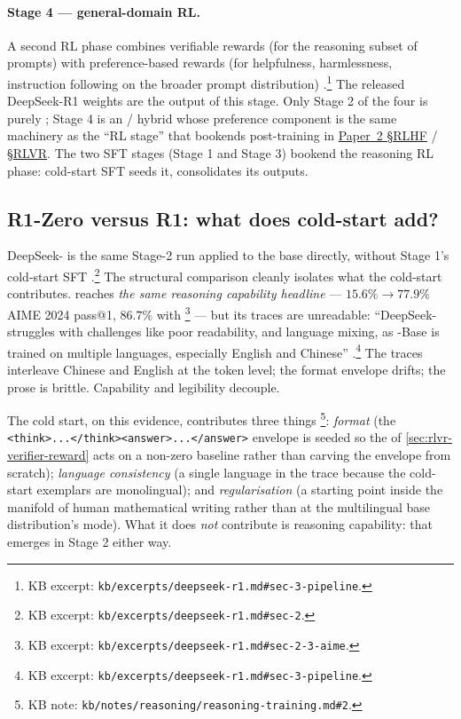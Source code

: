 \paragraph{Stage 4 --- general-domain RL.} A second RL phase combines
verifiable rewards (for the reasoning subset of prompts) with
preference-based rewards (for helpfulness, harmlessness, instruction
following on the broader prompt distribution) \citep[\S
3]{deepseek-r1}.\footnote{KB excerpt:
\nolinkurl{kb/excerpts/deepseek-r1.md#sec-3-pipeline}.} The released
DeepSeek-R1 weights are the output of this stage. Only Stage 2 of the
four is purely ; Stage 4 is an / hybrid whose preference
component is the same machinery as the ``RL stage'' that bookends
post-training in \hyperref[P2-sec:rlhf]{Paper~2 §RLHF} / \hyperref[P2-sec:rlvr-grpo]{§RLVR}. The two SFT stages (Stage 1 and
Stage 3) bookend the reasoning RL phase: cold-start SFT seeds it,
 consolidates its outputs.

\subsection{R1-Zero versus R1: what does cold-start add?}
\label{sec:r1-zero-vs-r1}

DeepSeek- is the same Stage-2  run applied to the
 base directly, without Stage 1's cold-start SFT
\citep[\S 2]{deepseek-r1}.\footnote{KB excerpt:
\nolinkurl{kb/excerpts/deepseek-r1.md#sec-2}.} The structural
comparison cleanly isolates what the cold-start contributes. 
reaches \emph{the same reasoning capability headline} ---
$15.6\%\!\to\!77.9\%$ AIME 2024 pass@1, $86.7\%$ with
 \citep[\S 2.3]{deepseek-r1}\footnote{KB excerpt:
\nolinkurl{kb/excerpts/deepseek-r1.md#sec-2-3-aime}.} --- but its
traces are unreadable: ``DeepSeek- struggles with challenges
like poor readability, and language mixing, as -Base is
trained on multiple languages, especially English and Chinese''
\citep[\S 3]{deepseek-r1}.\footnote{KB excerpt:
\nolinkurl{kb/excerpts/deepseek-r1.md#sec-3-pipeline}.} The traces
interleave Chinese and English at the token level; the format
envelope drifts; the prose is brittle. Capability and legibility
decouple.

The cold start, on this evidence, contributes three things
\citep[\S 3]{deepseek-r1}\footnote{KB note:
\nolinkurl{kb/notes/reasoning/reasoning-training.md#2}.}: \emph{format}
(the \texttt{<think>...</think><answer>...</answer>} envelope is
seeded so the  of \cref{sec:rlvr-verifier-reward} acts
on a non-zero baseline rather than carving the envelope from
scratch); \emph{language consistency} (a single language in the trace
because the cold-start exemplars are monolingual); and
\emph{regularisation} (a starting point inside the manifold of human
mathematical writing rather than at the multilingual base
distribution's mode). What it does \emph{not} contribute is reasoning
capability: that emerges in Stage 2 either way.

